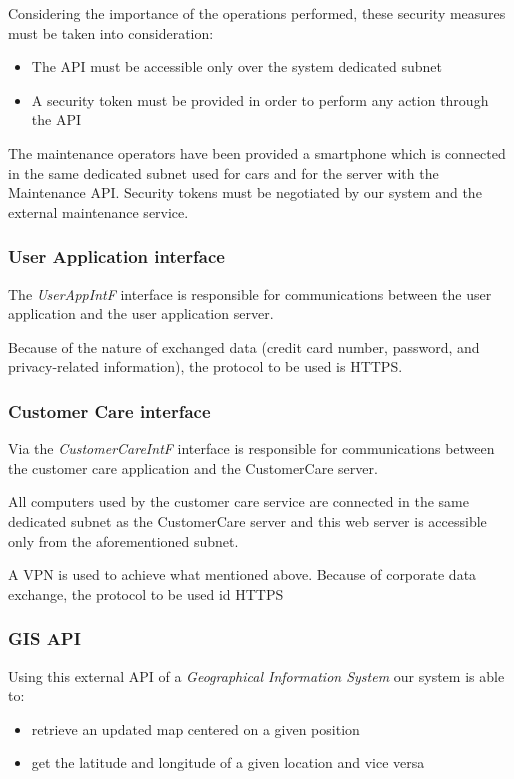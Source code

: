 Considering the importance of the operations performed, these security measures must be taken into consideration:
\begin{itemize}
	\item The API must be accessible only over the system dedicated subnet
	\item A security token must be provided in order to perform any action through the API
\end{itemize}
The maintenance operators have been provided a smartphone which is connected in the same dedicated subnet used for cars and for the server with the Maintenance API.
Security tokens must be negotiated by our system and the external maintenance service.

\subsubsection{User Application interface}
The \emph{UserAppIntF} interface is responsible for communications between the user application and the user application server.

Because of the nature of exchanged data (credit card number, password, and privacy-related information), the protocol to be used is HTTPS.

\subsubsection{Customer Care interface}
Via the \emph{CustomerCareIntF} interface is responsible for communications between the customer care application and the CustomerCare server.

All computers used by the customer care service are connected in the same dedicated subnet as the CustomerCare server and this web server is accessible only from the aforementioned subnet. 

A VPN is used to achieve what mentioned above. Because of corporate data exchange, the protocol to be used id HTTPS

\subsubsection{GIS API}
Using this external API of a \emph{Geographical Information System} our system is able to:
\begin{itemize}
	\item retrieve an updated map centered on a given position
	\item get the latitude and longitude of a given location and vice versa
\end{itemize}

